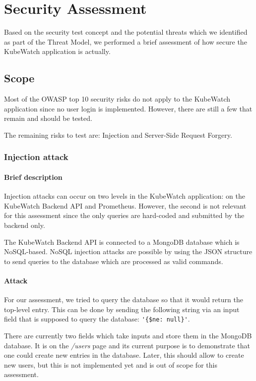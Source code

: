 \chapter{Security Assessment}

Based on the security test concept and the potential threats which we identified as part of the Threat Model, we performed a brief assessment of how secure the KubeWatch application is actually.

\section{Scope}

Most of the OWASP top 10 security risks do not apply to the KubeWatch application since no user login is implemented. However, there are still a few that remain and should be tested.

The remaining risks to test are: Injection and Server-Side Request Forgery. 

\subsection{Injection attack}
\subsubsection{Brief description}
Injection attacks can occur on two levels in the KubeWatch application: on the KubeWatch Backend API and Prometheus. However, the second is not relevant for this assessment since the only queries are hard-coded and submitted by the backend only.

The KubeWatch Backend API is connected to a MongoDB database which is NoSQL-based. NoSQL injection attacks are possible by using the JSON structure to send queries to the database which are processed as valid commands.

\subsubsection{Attack}
For our assessment, we tried to query the database so that it would return the top-level entry. This can be done by sending the following string via an input field that is supposed to query the database: \lstinline "'{$ne: null}'".

There are currently two fields which take inputs and store them in the MongoDB database. It is on the \textit{/users} page and its current purpose is to demonstrate that one could create new entries in the database. Later, this should allow to create new users, but this is not implemented yet and is out of scope for this assessment.

